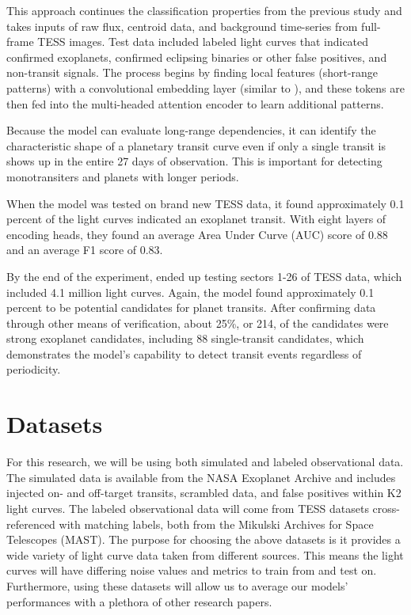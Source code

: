 \documentclass[letterpaper]{article} %
\begin{document}
This approach continues the classification properties from the previous study \cite{salinas2023distinguishingtransitfalsepositives} and takes inputs of raw flux, centroid data, and background time-series from full-frame TESS images. Test data included labeled light curves that indicated confirmed exoplanets, confirmed eclipsing binaries or other false positives, and non-transit signals. The process begins by finding local features (short-range patterns) with a convolutional embedding layer (similar to \cite{salinas2023distinguishingtransitfalsepositives}), and these tokens are then fed into the multi-headed attention encoder to learn additional patterns.

Because the model can evaluate long-range dependencies, it can identify the characteristic shape of a planetary transit curve even if only a single transit is shows up in the entire 27 days of observation. This is important for detecting monotransiters and planets with longer periods.

When the model was tested on brand new TESS data, it found approximately 0.1 percent of the light curves indicated an exoplanet transit. With eight layers of encoding heads, they found an average Area Under Curve (AUC) score of 0.88 and an average F1 score of 0.83. 

By the end of the experiment, \citeauthor{salinas2025tessfullframe} ended up testing sectors 1-26 of TESS data, which included 4.1 million light curves. Again, the model found approximately 0.1 percent to be potential candidates for planet transits. After confirming data through other means of verification, about 25\%, or 214, of the candidates were strong exoplanet candidates, including 88 single-transit candidates, which demonstrates the model's capability to detect transit events regardless of periodicity.

\section*{Datasets}
For this research, we will be using both simulated and labeled observational data. The simulated data is available from the NASA Exoplanet Archive and includes injected on- and off-target transits, scrambled data, and false positives within K2 light curves. The labeled observational data will come from TESS datasets cross-referenced with matching labels, both from the Mikulski Archives for Space Telescopes (MAST). The purpose for choosing the above datasets is it provides a wide variety of light curve data taken from different sources. This means the light curves will have differing noise values and metrics to train from and test on. Furthermore, using these datasets will allow us to average our models' performances with a plethora of other research papers.
\end{document}
